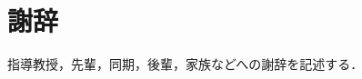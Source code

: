 \chapter*{謝辞}
\label{chap:Acknowledgement}

\begin{tcolorbox}
  指導教授，先輩，同期，後輩，家族などへの謝辞を記述する．
\end{tcolorbox}
